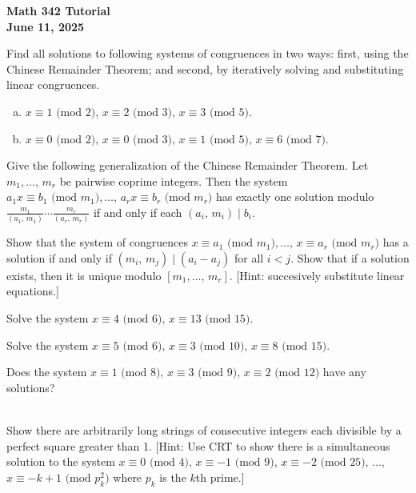 \documentclass[a4paper,11pt]{article}
\theoremstyle{mythm}
\theoremstyle{mydef}
\renewcommand{\pmod}[1]{\text{ (mod $#1$)}}
\begin{document}
\begin{center}
  {\Large\bfseries Math 342 Tutorial} \\
  {\normalsize\bf June 11, 2025}
\end{center}

 Find all solutions to following systems of
congruences in two ways: first, using the Chinese Remainder Theorem; and second,
by iteratively solving and substituting linear congruences.

\begin{enumerate}[(a)]
\item $x \equiv 1 \pmod{2},\, x \equiv 2 \pmod{3},\, x \equiv 3 \pmod{5}$.
\item $x \equiv 0 \pmod{2},\, x \equiv 0 \pmod{3},\, x \equiv 1 \pmod{5},\, x
  \equiv 6 \pmod{7}$.
\end{enumerate}

 Give the following generalization of the Chinese
Remainder Theorem. Let $m_1,\dots,\,m_r$ be pairwise coprime integers. Then the
system $a_1x \equiv b_1 \pmod{m_1}, \dots,\, a_rx \equiv b_r \pmod{m_r}$ has
exactly one solution modulo
$\frac{m_1}{(a_1,\,m_1)}\cdots\frac{m_r}{(a_r,\,m_r)}$ if and only if each
$(a_i,\,m_i) \mid b_i$. \\

\begin{enumerate*}[(a)]
\item Show that the system of congruences $x \equiv a_1 \pmod{m_1}, \dots,\, x
  \equiv a_r \pmod{m_r}$ has a solution if and only if $(m_i,\,m_j) \mid
  (a_i-a_j)$ for all $i<j$. Show that if a solution exists, then it is unique
  modulo $[m_1,\dots,\,m_r]$. [Hint: succesively substitute linear equations.]
\item Solve the system $x \equiv 4 \pmod{6},\, x \equiv 13 \pmod{15}$.
\item Solve the system $x \equiv 5 \pmod{6},\, x \equiv 3 \pmod{10},\, x \equiv
  8 \pmod{15}$.
\item Does the system $x \equiv 1 \pmod{8},\, x \equiv 3 \pmod{9}$, $x \equiv 2
  \pmod{12}$ have any solutions?
\end{enumerate*} \\

 Show there are arbitrarily long strings of
consecutive integers each divisible by a perfect square greater than 1. [Hint:
Use CRT to show there is a simultaneous solution to the system $x \equiv 0
\pmod{4}$, $x \equiv -1 \pmod{9}$, $x \equiv -2 \pmod{25}$, $\dots$, $x \equiv
-k+1 \pmod{p_k^2}$ where $p_k$ is the $k$th prime.] \\
\end{document}
